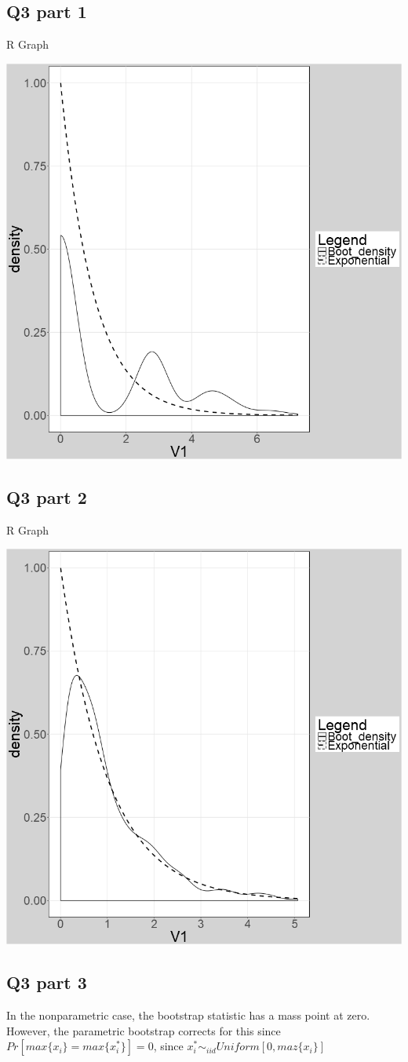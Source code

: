 \documentclass[11pt]{article}
\begin{document}
\subsection{Q3 part 1}
\centerline{R Graph }
\begin{center}
	\includegraphics[width=.8\linewidth]{plot_q3_1.png}	
\end{center}


\subsection{Q3 part 2}
\centerline{R Graph }
\begin{center}
	\includegraphics[width=.8\linewidth]{plot_q3_2.png}	
\end{center}

\subsection{Q3 part 3}
In the nonparametric case, the bootstrap statistic has a mass point at zero. However, the parametric bootstrap corrects for this since $Pr[max\{x_i\} = max\{x_i^*\}] = 0$, since $x_i^* \sim_{iid} Uniform[0,maz\{x_i\}]$
\end{document}
